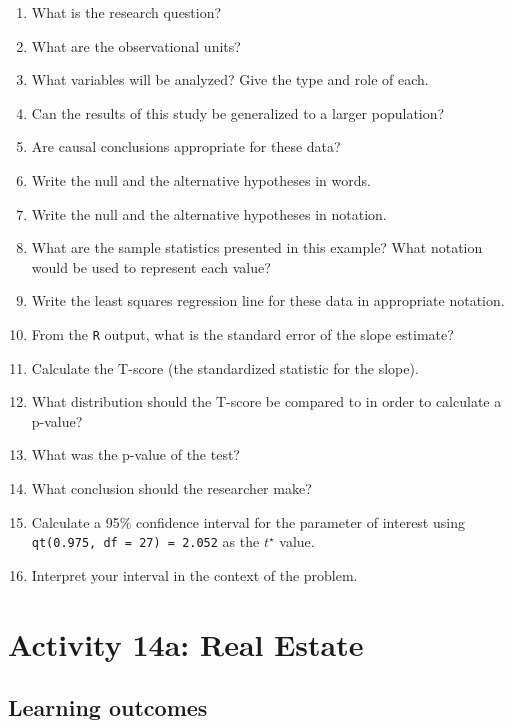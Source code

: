 \documentclass[
]{report}
\newcommand{\rgs}{\vspace{12pt}} %
\begin{document}
\begin{enumerate}
\def\labelenumi{\arabic{enumi}.}
\item
  What is the research question?
  \rgs
\item
  What are the observational units?
  \rgs
\item
  What variables will be analyzed? Give the type and role of each.
  \rgs
  \rgs
\item
  Can the results of this study be generalized to a larger population?
  \rgs
\item
  Are causal conclusions appropriate for these data?
  \rgs
\item
  Write the null and the alternative hypotheses in words.
  \rgs
  \rgs
\item
  Write the null and the alternative hypotheses in notation.
  \rgs
\item
  What are the sample statistics presented in this example? What notation would be used to represent each value?
  \rgs
\item
  Write the least squares regression line for these data in appropriate notation.
  \rgs
\item
  From the \texttt{R} output, what is the standard error of the slope estimate?
  \rgs
\item
  Calculate the T-score (the standardized statistic for the slope).
  \rgs
  \rgs
\item
  What distribution should the T-score be compared to in order to calculate a p-value?
  \rgs
\item
  What was the p-value of the test?
  \rgs
\item
  What conclusion should the researcher make?
  \rgs
  \rgs
\item
  Calculate a 95\% confidence interval for the parameter of interest using \texttt{qt(0.975,\ df\ =\ 27)\ =\ 2.052} as the \(t^\star\) value.
  \rgs
  \rgs
\item
  Interpret your interval in the context of the problem.
  \rgs
  \rgs
\end{enumerate}

\newpage

\hypertarget{activity-14a-real-estate}{%
\section{Activity 14a: Real Estate}\label{activity-14a-real-estate}}


\hypertarget{learning-outcomes-8}{%
\subsection{Learning outcomes}\label{learning-outcomes-8}}
\end{document}
